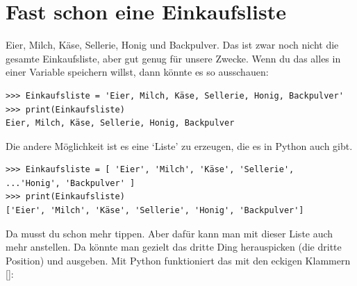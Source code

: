 \section{Fast schon eine Einkaufsliste}

Eier, Milch, Käse, Sellerie, Honig und Backpulver. Das ist zwar noch nicht die gesamte Einkaufsliste, aber gut genug für unsere Zwecke. Wenn du das alles in einer Variable speichern willst, dann könnte es so ausschauen:

\begin{Verbatim}[frame=single]
>>> Einkaufsliste = 'Eier, Milch, Käse, Sellerie, Honig, Backpulver'
>>> print(Einkaufsliste)
Eier, Milch, Käse, Sellerie, Honig, Backpulver
\end{Verbatim}

Die andere Möglichkeit ist es eine `Liste' zu erzeugen, die es in Python auch gibt.

\begin{Verbatim}[frame=single]
>>> Einkaufsliste = [ 'Eier', 'Milch', 'Käse', 'Sellerie',
...'Honig', 'Backpulver' ]
>>> print(Einkaufsliste)
['Eier', 'Milch', 'Käse', 'Sellerie', 'Honig', 'Backpulver']
\end{Verbatim}

Da musst du schon mehr tippen. Aber dafür kann man mit dieser Liste auch mehr anstellen. Da könnte man gezielt das dritte Ding herauspicken (die dritte Position) und ausgeben. Mit Python funktioniert das mit den eckigen Klammern []:

